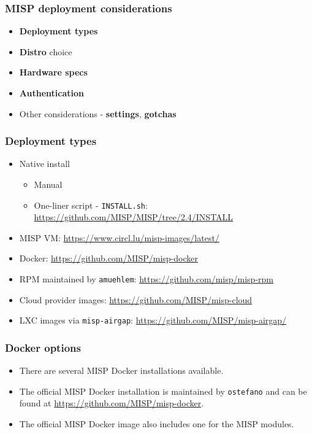 
\begin{frame}[t,plain]
\titlepage
\end{frame}

\begin{frame}
\frametitle{MISP deployment considerations}
    \begin{itemize}
        \item {\bf Deployment types}
        \item {\bf Distro} choice
        \item {\bf Hardware specs}
        \item {\bf Authentication}
        \item Other considerations - {\bf settings}, {\bf gotchas}
    \end{itemize}
\end{frame}

\begin{frame}
\frametitle{Deployment types}
    \begin{itemize}
        \item Native install
        \begin{itemize}
            \item Manual
            \item One-liner script - \texttt{INSTALL.sh}: \url{https://github.com/MISP/MISP/tree/2.4/INSTALL}
        \end{itemize}
        \item MISP VM: \url{https://www.circl.lu/misp-images/latest/}
        \item Docker: \url{https://github.com/MISP/misp-docker}
        \item RPM maintained by \texttt{amuehlem}: \url{https://github.com/misp/misp-rpm}
        \item Cloud provider images: \url{https://github.com/MISP/misp-cloud}
        \item LXC images via \texttt{misp-airgap}: \url{https://github.com/MISP/misp-airgap/}
    \end{itemize}
\end{frame}

\begin{frame}
\frametitle{Docker options}
    \begin{itemize}
        \item There are several MISP Docker installations available.
        \item The official MISP Docker installation is maintained by \texttt{ostefano} and can be found at \url{https://github.com/MISP/misp-docker}.
        \item The official MISP Docker image also includes one for the MISP modules.
    \end{itemize}
\end{frame}

